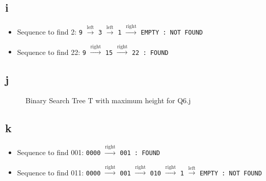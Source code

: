 \documentclass[11pt]{article}
\begin{document}
\subsection*{i}
\begin{itemize}
    \item Sequence to find 2: \texttt{9} $\xrightarrow{\text{left}}$ \texttt{3} $\xrightarrow{\text{left}}$ \texttt{1} $\xrightarrow{\text{right}}$ \texttt{EMPTY : NOT FOUND} 
    \item Sequence to find 22: \texttt{9} $\xrightarrow{\text{right}}$ \texttt{15} $\xrightarrow{\text{right}}$ \texttt{22 : FOUND}
    
\end{itemize}

\subsection*{j}

\begin{figure}[H]
	\centering
	\caption{Binary Search Tree T with maximum height for Q6.j}	
	\label{bintreeq62}
\end{figure}

\subsection*{k}

\begin{itemize}
    \item Sequence to find 001: \texttt{0000} $\xrightarrow{\text{right}}$ \texttt{001 : FOUND} 
    \item Sequence to find 011: \texttt{0000} $\xrightarrow{\text{right}}$ \texttt{001} $\xrightarrow{\text{right}}$ \texttt{010} $\xrightarrow{\text{right}}$ \texttt{1} $\xrightarrow{\text{left}}$ \texttt{EMPTY : NOT FOUND}
    
\end{itemize}
\end{document}
